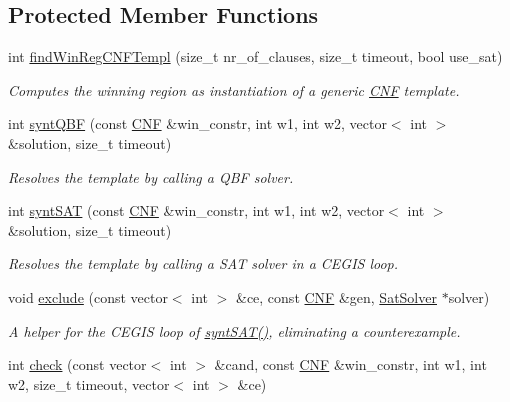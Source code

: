 \subsection*{Protected Member Functions}
\begin{DoxyCompactItemize}
\item 
int \hyperlink{classTemplExplorer_a7b6fbb17618742f322184ce37002a7f0}{find\-Win\-Reg\-C\-N\-F\-Templ} (size\-\_\-t nr\-\_\-of\-\_\-clauses, size\-\_\-t timeout, bool use\-\_\-sat)
\begin{DoxyCompactList}\small\item\em Computes the winning region as instantiation of a generic \hyperlink{classCNF}{C\-N\-F} template. \end{DoxyCompactList}\item 
int \hyperlink{classTemplExplorer_a41d428d7ce65dbecb5d996b4957cc8c5}{synt\-Q\-B\-F} (const \hyperlink{classCNF}{C\-N\-F} \&win\-\_\-constr, int w1, int w2, vector$<$ int $>$ \&solution, size\-\_\-t timeout)
\begin{DoxyCompactList}\small\item\em Resolves the template by calling a Q\-B\-F solver. \end{DoxyCompactList}\item 
int \hyperlink{classTemplExplorer_adfba86d1d4bb40be2027c0cba3d447b3}{synt\-S\-A\-T} (const \hyperlink{classCNF}{C\-N\-F} \&win\-\_\-constr, int w1, int w2, vector$<$ int $>$ \&solution, size\-\_\-t timeout)
\begin{DoxyCompactList}\small\item\em Resolves the template by calling a S\-A\-T solver in a C\-E\-G\-I\-S loop. \end{DoxyCompactList}\item 
void \hyperlink{classTemplExplorer_ab6b8b0ac9960d113c9d326e633353d55}{exclude} (const vector$<$ int $>$ \&ce, const \hyperlink{classCNF}{C\-N\-F} \&gen, \hyperlink{classSatSolver}{Sat\-Solver} $\ast$solver)
\begin{DoxyCompactList}\small\item\em A helper for the C\-E\-G\-I\-S loop of \hyperlink{classTemplExplorer_adfba86d1d4bb40be2027c0cba3d447b3}{synt\-S\-A\-T()}, eliminating a counterexample. \end{DoxyCompactList}\item 
int \hyperlink{classTemplExplorer_a816e971f521911d1d6bba8059c5f89ec}{check} (const vector$<$ int $>$ \&cand, const \hyperlink{classCNF}{C\-N\-F} \&win\-\_\-constr, int w1, int w2, size\-\_\-t timeout, vector$<$ int $>$ \&ce)

\end{DoxyCompactItemize}
